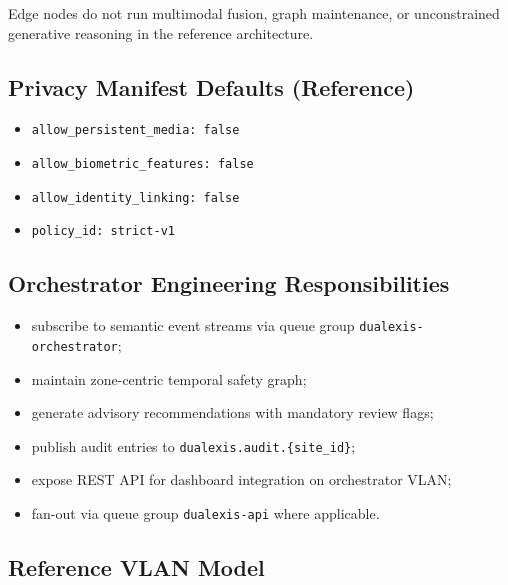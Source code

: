 Edge nodes do not run multimodal fusion, graph maintenance, or unconstrained generative
reasoning in the reference architecture.

\subsection{Privacy Manifest Defaults (Reference)}

\begin{itemize}[noitemsep]
  \item \texttt{allow\_persistent\_media: false}
  \item \texttt{allow\_biometric\_features: false}
  \item \texttt{allow\_identity\_linking: false}
  \item \texttt{policy\_id: strict-v1}
\end{itemize}

\subsection{Orchestrator Engineering Responsibilities}

\begin{itemize}[noitemsep]
  \item subscribe to semantic event streams via queue group \texttt{dualexis-orchestrator};
  \item maintain zone-centric temporal safety graph;
  \item generate advisory recommendations with mandatory review flags;
  \item publish audit entries to \texttt{dualexis.audit.\{site\_id\}};
  \item expose REST API for dashboard integration on orchestrator VLAN;
  \item fan-out via queue group \texttt{dualexis-api} where applicable.
\end{itemize}

\subsection{Reference VLAN Model}

